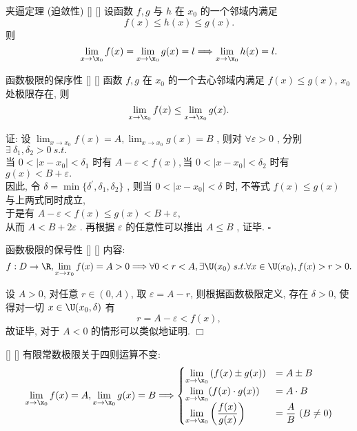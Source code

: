 \documentclass[UTF8]{ctexart}
\begin{document}
			

			\begin{ppt}
			    []
			    {夹逼定理 (迫敛性) }
			    []
			    []
				设函数 \(f,g\) 与 \(h\) 在 \(x_0\) 的一个邻域内满足
				\[f(x)\leq h(x)\leq g(x).\]
				则\[\lim\limits_{x\to\x_0}f(x)=\lim\limits_{x\to\x_0}g(x)=l\Longrightarrow\lim\limits_{x\to\x_0}h(x)=l.\]
			\end{ppt}

			\begin{ppt}
			    []
			    {函数极限的保序性}
			    []
			    []
				函数 \(f,g\) 在 \(x_0\) 的一个去心邻域内满足 \(f(x)\leq g(x)\), \(x_0\) 处极限存在, 则
					\[\lim\limits_{x\to\x_0}f(x)\leq\lim\limits_{x\to\x_0}g(x).\]
			\end{ppt}
   
			\begin{prf}
				证: 设 \(\displaystyle\lim_{x\rightarrow x_0}f(x)=A , \displaystyle\lim_{x\rightarrow x_0}g(x)=B\) , 则对 \(\forall\varepsilon>0\) , 分别\(\exists \ \delta_1 , \delta_2 >0 \ s.t.\) \\
				当 \(0<|x-x_0|<\delta_1\) 时有 \(A-\varepsilon<f(x),\)当 \(0<|x-x_0|<\delta_2\) 时有 \(g(x)<B+\varepsilon.\)\\
				因此, 令 \(\delta=\min\{\delta^\prime,\delta_1,\delta_2\}\) , 则当 
				\(0<|x-x_0|<\delta\) 时, 不等式 
				\(f(x)\leq g(x)\) 与上两式同时成立, \\
				于是有 \(A-\varepsilon<f(x)\leq g(x)<B+\varepsilon,\)\\
				从而 
				\(A<B+2\varepsilon\) . 再根据 
				\(\varepsilon\) 的任意性可以推出 \(A\leq B\) , 证毕.  \(\square\)
			\end{prf}
   
            \begin{ppt}
			    []
			    {函数极限的保号性}
			    []
			    []
                内容: 
                \[f:D\to\R,\displaystyle\lim_{x\rightarrow x_0}f(x)=A>0\Longrightarrow\forall 0<r<A,\exists \U(x_0)\ s.t. \forall x\in \U(x_0),f(x)>r>0.\]
            \end{ppt}

				\begin{prf}
				设 \(A > 0\), 对任意 \(r \in (0, A)\), 取 \(\varepsilon = A - r\), 则根据函数极限定义, 存在 \(\delta > 0\), 使得对一切 \(x \in \U(x_0, \delta)\) 有\[r = A - \varepsilon < f(x),\]
			    故证毕, 对于 \(A < 0\) 的情形可以类似地证明. \(\Box\)
				\end{prf}
   
            \begin{ppt}
			    []
			    {}
			    []
			    []
				有限常数极限关于四则运算不变: 
				\[\lim_{x\to\x_0}f(x)=A, \lim_{x\to\x_0}g(x)=B\Longrightarrow
				\begin{cases}
					\lim\limits_{x\to\x_0}\left(f(x)\pm g(x)\right) & =A\pm B\\
					\lim\limits_{x\to\x_0}(f(x)\cdot g(x)) & =A\cdot B\\
					\lim\limits_{x\to\x_0}\left(\dfrac{f(x)}{g(x)}\right) & =\dfrac{A}{B} \ (B\neq 0)\\
				\end{cases}\]
			\end{ppt}
                
\end{document}
